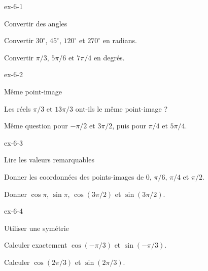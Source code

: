 \begin{blocLivre}{ex-6-1}
\begin{exercice}[1]{Convertir des angles}
\begin{questions}
\item Convertir $30^\circ$, $45^\circ$, $120^\circ$ et $270^\circ$ en radians.
\item Convertir $\pi/3$, $5\pi/6$ et $7\pi/4$ en degrés.
\end{questions}
\end{exercice}
\end{blocLivre}
\begin{blocLivre}{ex-6-2}
\begin{exercice}[1]{Même point-image}
\begin{questions}
\item Les réels $\pi/3$ et $13\pi/3$ ont-ils le même point-image ?
\item Même question pour $-\pi/2$ et $3\pi/2$, puis pour $\pi/4$ et $5\pi/4$.
\end{questions}
\label{figlivre-r06-02-images-ex}

\end{exercice}
\end{blocLivre}
\begin{blocLivre}{ex-6-3}
\begin{exercice}[1]{Lire les valeurs remarquables}
\begin{questions}
\item Donner les coordonnées des points-images de $0$, $\pi/6$, $\pi/4$ et $\pi/2$.
\item Donner $\cos\pi$, $\sin\pi$, $\cos(3\pi/2)$ et $\sin(3\pi/2)$.
\end{questions}
\label{figlivre-r06-03-valeurs-ex}

\end{exercice}
\end{blocLivre}
\begin{blocLivre}{ex-6-4}
\begin{exercice}[1]{Utiliser une symétrie}
\begin{questions}
\item Calculer exactement $\cos(-\pi/3)$ et $\sin(-\pi/3)$.
\item Calculer $\cos(2\pi/3)$ et $\sin(2\pi/3)$.
\end{questions}
\label{figlivre-r06-04-symetries-ex}

\end{exercice}
\end{blocLivre}
